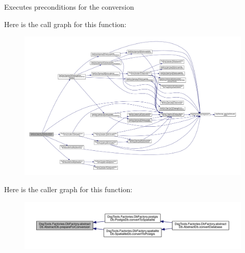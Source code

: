 \begin{DoxyVerb}Executes preconditions for the conversion
\end{DoxyVerb}
 Here is the call graph for this function\+:
\nopagebreak
\begin{figure}[H]
\begin{center}
\leavevmode
\includegraphics[width=350pt]{class_dsg_tools_1_1_factories_1_1_db_factory_1_1abstract_db_1_1_abstract_db_aed5b42455a633ecafc823b7f8591cce7_cgraph}
\end{center}
\end{figure}
Here is the caller graph for this function\+:
\nopagebreak
\begin{figure}[H]
\begin{center}
\leavevmode
\includegraphics[width=350pt]{class_dsg_tools_1_1_factories_1_1_db_factory_1_1abstract_db_1_1_abstract_db_aed5b42455a633ecafc823b7f8591cce7_icgraph}
\end{center}
\end{figure}
\mbox{\label{class_dsg_tools_1_1_factories_1_1_db_factory_1_1abstract_db_1_1_abstract_db_acd6bf5e448b6666716bcd76de48995ca}} 
